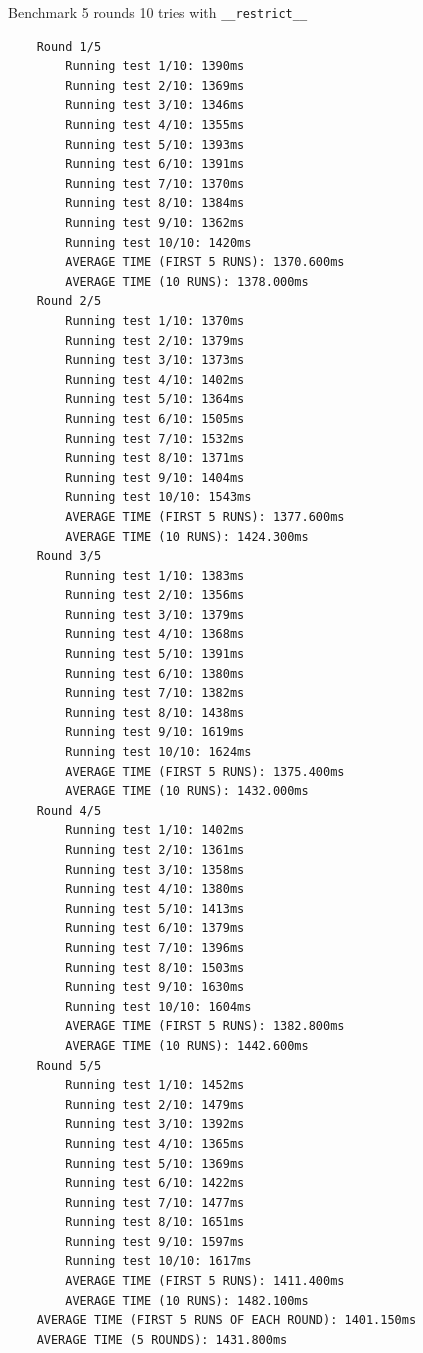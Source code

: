 Benchmark 5 rounds 10 tries with \verb|__restrict__|
\footnotesize\begin{verbatim}
    Round 1/5
        Running test 1/10: 1390ms
        Running test 2/10: 1369ms
        Running test 3/10: 1346ms
        Running test 4/10: 1355ms
        Running test 5/10: 1393ms
        Running test 6/10: 1391ms
        Running test 7/10: 1370ms
        Running test 8/10: 1384ms
        Running test 9/10: 1362ms
        Running test 10/10: 1420ms
        AVERAGE TIME (FIRST 5 RUNS): 1370.600ms
        AVERAGE TIME (10 RUNS): 1378.000ms
    Round 2/5
        Running test 1/10: 1370ms
        Running test 2/10: 1379ms
        Running test 3/10: 1373ms
        Running test 4/10: 1402ms
        Running test 5/10: 1364ms
        Running test 6/10: 1505ms
        Running test 7/10: 1532ms
        Running test 8/10: 1371ms
        Running test 9/10: 1404ms
        Running test 10/10: 1543ms
        AVERAGE TIME (FIRST 5 RUNS): 1377.600ms
        AVERAGE TIME (10 RUNS): 1424.300ms
    Round 3/5
        Running test 1/10: 1383ms
        Running test 2/10: 1356ms
        Running test 3/10: 1379ms
        Running test 4/10: 1368ms
        Running test 5/10: 1391ms
        Running test 6/10: 1380ms
        Running test 7/10: 1382ms
        Running test 8/10: 1438ms
        Running test 9/10: 1619ms
        Running test 10/10: 1624ms
        AVERAGE TIME (FIRST 5 RUNS): 1375.400ms
        AVERAGE TIME (10 RUNS): 1432.000ms
    Round 4/5
        Running test 1/10: 1402ms
        Running test 2/10: 1361ms
        Running test 3/10: 1358ms
        Running test 4/10: 1380ms
        Running test 5/10: 1413ms
        Running test 6/10: 1379ms
        Running test 7/10: 1396ms
        Running test 8/10: 1503ms
        Running test 9/10: 1630ms
        Running test 10/10: 1604ms
        AVERAGE TIME (FIRST 5 RUNS): 1382.800ms
        AVERAGE TIME (10 RUNS): 1442.600ms
    Round 5/5
        Running test 1/10: 1452ms
        Running test 2/10: 1479ms
        Running test 3/10: 1392ms
        Running test 4/10: 1365ms
        Running test 5/10: 1369ms
        Running test 6/10: 1422ms
        Running test 7/10: 1477ms
        Running test 8/10: 1651ms
        Running test 9/10: 1597ms
        Running test 10/10: 1617ms
        AVERAGE TIME (FIRST 5 RUNS): 1411.400ms
        AVERAGE TIME (10 RUNS): 1482.100ms
    AVERAGE TIME (FIRST 5 RUNS OF EACH ROUND): 1401.150ms
    AVERAGE TIME (5 ROUNDS): 1431.800ms
\end{verbatim}
\normalsize
